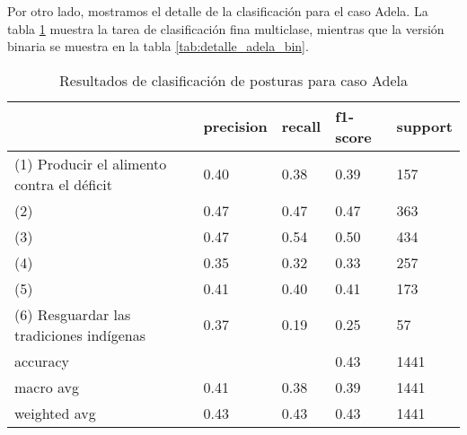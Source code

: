 \documentclass[
	spanish, %
	letterpaper, oneside
]{article}
\begin{document}
\newp Por otro lado, mostramos el detalle de la clasificación para el caso Adela. La tabla \ref{tab:detalle_adela} muestra la tarea de clasificación fina multiclase, mientras que la versión binaria se muestra en la tabla \ref{tab:detalle_adela_bin}.


\begin{table}[htbp]
\centering
\caption{Resultados de clasificación de posturas para caso Adela}
\begin{tabular}{|l|l|l|l|l|}
\hline
\textbf{}    & \textbf{precision} & \textbf{recall} & \textbf{f1-score} & \textbf{support} \\ \hline
(1) Producir el alimento contra el déficit            & 0.40               & 0.38            & 0.39              & 157              \\ \hline
(2)            & 0.47               & 0.47            & 0.47              & 363              \\ \hline
(3)            & 0.47               & 0.54            & 0.50              & 434              \\ \hline
(4)            & 0.35               & 0.32            & 0.33              & 257              \\ \hline
(5)           & 0.41               & 0.40            & 0.41              & 173              \\ \hline
(6) Resguardar las tradiciones indígenas            & 0.37               & 0.19            & 0.25              & 57               \\ \hline
accuracy     &                    &                 & 0.43              & 1441             \\ \hline
macro avg    & 0.41               & 0.38            & 0.39              & 1441             \\ \hline
weighted avg & 0.43               & 0.43            & 0.43              & 1441             \\ \hline
\end{tabular}
\label{tab:detalle_adela}
\end{table}
\end{document}
